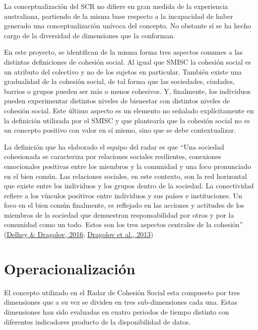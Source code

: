 \documentclass[
  12pt,
]{book}
\begin{document}
La conceptualización del SCR no difiere en gran medida de la experiencia australiana, partiendo de la misma base respecto a la incapacidad de haber generado una conceptualización unívoca del concepto. No obstante sí se ha hecho cargo de la diversidad de dimensiones que la conforman.

En este proyecto, se identifican de la misma forma tres aspectos comunes a las distintas definiciones de cohesión social. Al igual que SMISC la cohesión social es un atributo del colectivo y no de los sujetos en particular. También existe una gradualidad de la cohesión social, de tal forma que las sociedades, ciudades, barrios o grupos pueden ser más o menos cohesivos. Y, finalmente, los individuos pueden experimentar distintos niveles de bienestar con distintos niveles de cohesión social. Este último aspecto es un elemento no señalado explícitamente en la definición utilizada por el SMISC y que plantearía que la cohesión social no es un concepto positivo con valor en sí mismo, sino que se debe contextualizar.

La definición que ha elaborado el equipo del radar es que ``Una sociedad cohesionada se caracteriza por relaciones sociales resilientes, conexiones emocionales positivas entre los miembros y la comunidad y una foco pronunciado en el bien común. Las relaciones sociales, en este contexto, son la red horizontal que existe entre los individuos y los grupos dentro de la sociedad. La conectividad refiere a los vínculos positivos entre individuos y sus países e instituciones. Un foco en el bien común finalmente, es reflejado en las acciones y actitudes de los miembros de la sociedad que demuestran responsabilidad por otros y por la comunidad como un todo. Estos son los tres aspectos centrales de la cohesión'' (\protect\hyperlink{ref-delhey_Happier_2016}{Delhey \& Dragolov, 2016}; \protect\hyperlink{ref-dragolov2013social}{Dragolov et al., 2013})

\hypertarget{operacionalizaciuxf3n-2}{%
\section{Operacionalización}\label{operacionalizaciuxf3n-2}}

El concepto utilizado en el Radar de Cohesión Social esta compuesto por tres dimensiones que a su vez se dividen en tres sub-dimensiones cada una. Estas dimensiones han sido evaluadas en cuatro periodos de tiempo distinto con diferentes indicadores producto de la disponibilidad de datos.
\end{document}
